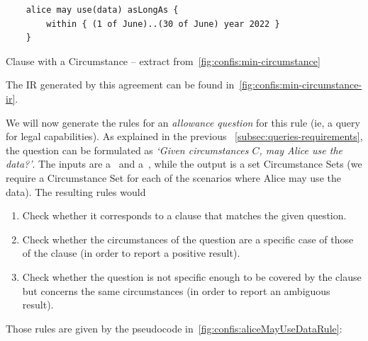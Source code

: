 \begin{listing}[h]
    \centering
    \begin{minipage}{0.7\textwidth}
        \begin{verbatim}
    alice may use(data) asLongAs {
        within { (1 of June)..(30 of June) year 2022 }
    }
        \end{verbatim}
    \end{minipage}
    \caption{Clause with a Circumstance -- extract from~\autoref{fig:confis:min-circumstance}}
    \label{fig:confis:aliceMayUseDataCClause}
\end{listing}

The IR generated by this agreement can be found in~\autoref{fig:confis:min-circumstance-ir}.

We will now generate the rules for an \emph{allowance question} for this rule (ie, a query for legal capabilities).
As explained in the previous ~\autoref{subsec:queries-requirements}, the question can be formulated as \emph{`Given circumstances $C$, may Alice use the data?'}.
The inputs are a~ and a~, while the output is a set Circumstance Sets (we require a Circumstance Set for each of the scenarios where Alice may use the data).
The resulting rules would
\begin{enumerate}
    \item Check whether it corresponds to a clause that matches the given question.
    \item Check whether the circumstances of the question are a specific case of those of the clause (in order to report a positive result).
    \item Check whether the question is not specific enough to be covered by the clause but concerns the same circumstances (in order to report an ambiguous result).
\end{enumerate}

Those rules are given by the pseudocode in~\autoref{fig:confis:aliceMayUseDataRule}:

